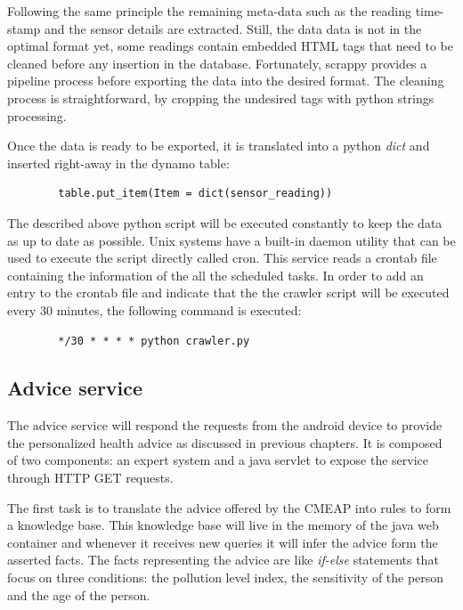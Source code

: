 Following the same principle the remaining meta-data such as the reading time-stamp and the sensor details are extracted. Still, the data data is not in the optimal format yet, some readings contain embedded HTML tags that need to be cleaned before any insertion in the database. Fortunately, scrappy provides a pipeline process before exporting the data into the desired format. The cleaning process is straightforward, by cropping the undesired tags with python strings processing. 

Once the data is ready to be exported, it is translated into a python \textit{dict} and inserted right-away in the dynamo table: \bigskip

{\centering
\begin{BVerbatim}
        table.put_item(Item = dict(sensor_reading))
\end{BVerbatim}
\par
}\bigskip


The described above python script will be executed constantly to keep the data as up to date as possible. Unix systems have a built-in daemon utility that can be used to execute the script directly called cron. This service reads a crontab file containing the information of the all the scheduled tasks. In order to add an entry to the crontab file and indicate that the the crawler script will be executed every 30 minutes, the following command is executed: \bigskip

{\centering
\begin{BVerbatim}
        */30 * * * * python crawler.py
\end{BVerbatim}
\par
}

\subsection{Advice service}
The advice service will respond the requests from the android device to provide the personalized health advice as discussed in previous chapters. It is composed of two components: an expert system and a java servlet to expose the service through HTTP GET requests. 

The first task is to translate the advice offered by the CMEAP into rules to form a knowledge base. This knowledge base will live in the memory of the java web container and whenever it receives new queries it will infer the advice form the asserted facts. The facts representing the advice are like \textit{if-else} statements that focus on three conditions: the pollution level index, the sensitivity of the person and the age of the person. 

